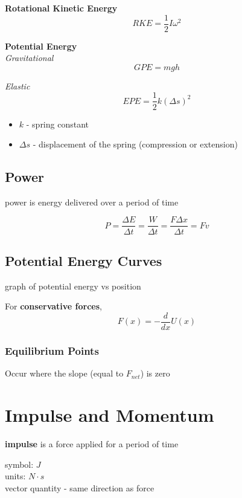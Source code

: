 \documentclass[titlepage]{article}
\begin{document}
\textbf{Rotational Kinetic Energy}
\begin{equation*}
    RKE = \frac{1}{2} I \omega ^ 2
\end{equation*}

\textbf{Potential Energy} \\
\emph{Gravitational}
\begin{equation*}
    GPE = mgh
\end{equation*}

\emph{Elastic}
\begin{equation*}
    EPE = \frac{1}{2}k (\Delta s)^2
\end{equation*}
\begin{itemize}
    \item $k$ - spring constant
    \item $\Delta s$ - displacement of the spring (compression or extension)
\end{itemize}

\subsection{Power}
power is energy delivered over a period of time

\begin{equation*}
    P = \frac{\Delta E}{\Delta t} = \frac{W}{\Delta t} = \frac{F \Delta x}{\Delta t} = Fv
\end{equation*}

\subsection{Potential Energy Curves}
graph of potential energy vs position

For \textbf{conservative forces},
\begin{equation*}
    F(x) = -\frac{d}{dx} U(x)
\end{equation*}

\subsubsection{Equilibrium Points}
Occur where the slope (equal to $F_{net}$) is zero


\section{Impulse and Momentum}
\textbf{impulse} is a force applied for a period of time

symbol: $J$ \\
units: $N \cdot s$\\
vector quantity - same direction as force
\end{document}

